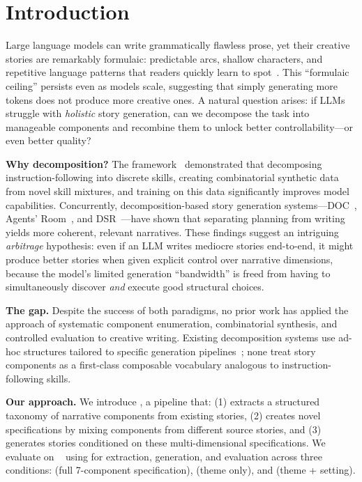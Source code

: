 \section{Introduction}
\label{sec:intro}

Large language models can write grammatically flawless prose, yet their creative stories are remarkably formulaic: predictable arcs, shallow characters, and repetitive language patterns that readers quickly learn to spot~\cite{chakrabarty2023art}.
This ``formulaic ceiling'' persists even as models scale, suggesting that simply generating more tokens does not produce more creative ones.
A natural question arises: if LLMs struggle with \emph{holistic} story generation, can we decompose the task into manageable components and recombine them to unlock better controllability---or even better quality?

{\bf Why decomposition?}
The \skillmix framework~\cite{allenzhu2024instructskillmix} demonstrated that decomposing instruction-following into discrete skills, creating combinatorial synthetic data from novel skill mixtures, and training on this data significantly improves model capabilities.
Concurrently, decomposition-based story generation systems---DOC~\cite{yang2023doc}, Agents' Room~\cite{huot2024agentsroom}, and DSR~\cite{dsr2025}---have shown that separating planning from writing yields more coherent, relevant narratives.
These findings suggest an intriguing \emph{arbitrage} hypothesis: even if an LLM writes mediocre stories end-to-end, it might produce better stories when given explicit control over narrative dimensions, because the model's limited generation ``bandwidth'' is freed from having to simultaneously discover \emph{and} execute good structural choices.

{\bf The gap.}
Despite the success of both paradigms, no prior work has applied the \skillmix approach of systematic component enumeration, combinatorial synthesis, and controlled evaluation to creative writing.
Existing decomposition systems use ad-hoc structures tailored to specific generation pipelines~\cite{yang2023doc,huot2024agentsroom}; none treat story components as a first-class composable vocabulary analogous to instruction-following skills.

{\bf Our approach.}
We introduce \methodname, a pipeline that: (1) extracts a structured taxonomy of narrative components from existing stories, (2) creates novel specifications by mixing components from different source stories, and (3) generates stories conditioned on these multi-dimensional specifications.
We evaluate on \rocstories~\cite{mostafazadeh2016corpus} using \gptfour for extraction, generation, and evaluation across three conditions: \compcontrolled (full 7-component specification), \titleonly (theme only), and \prompted (theme + setting).


